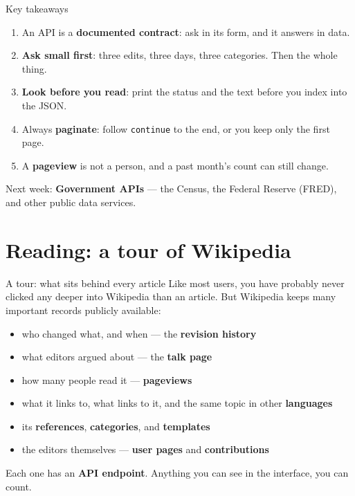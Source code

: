 \documentclass[9pt,aspectratio=169]{beamer}
\begin{document}
\begin{frame}{Key takeaways}
    \begin{enumerate}
        \item An API is a \textbf{documented contract}: ask in its form, and it answers in data.
        \item \textbf{Ask small first}: three edits, three days, three categories. Then the whole thing.
        \item \textbf{Look before you read}: print the status and the text before you index into the JSON.
        \item Always \textbf{paginate}: follow \texttt{continue} to the end, or you keep only the first page.
        \item A \textbf{pageview} is not a person, and a past month's count can still change.
    \end{enumerate}
    \bigskip
    \centering\small Next week: \textbf{Government APIs} --- the Census, the Federal Reserve (FRED), and other public data services.
\end{frame}

\section{Reading: a tour of Wikipedia}

\begin{frame}{A tour: what sits behind every article}
    Like most users, you have probably never clicked any deeper into Wikipedia than an article. But Wikipedia keeps many important records publicly available:
    \begin{itemize}
        \item who changed what, and when --- the \textbf{revision history}
        \item what editors argued about --- the \textbf{talk page}
        \item how many people read it --- \textbf{pageviews}
        \item what it links to, what links to it, and the same topic in other \textbf{languages}
        \item its \textbf{references}, \textbf{categories}, and \textbf{templates}
        \item the editors themselves --- \textbf{user pages} and \textbf{contributions}
    \end{itemize}
    \bigskip
    Each one has an \textbf{API endpoint}. Anything you can see in the interface, you can count.
\end{frame}
\end{document}
